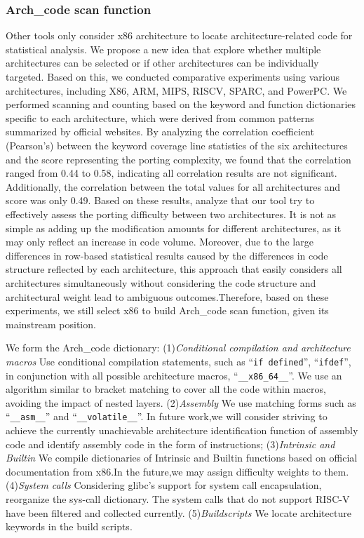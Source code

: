 \documentclass[sigconf,screen,review,anonymous]{acmart}
\begin{document}
\subsubsection{Arch\_code scan function}
Other tools only consider x86 architecture to locate architecture-related code for statistical analysis. We propose a new idea that explore whether multiple architectures can be selected or if other architectures can be individually targeted. Based on this, we conducted comparative experiments using various architectures, including X86, ARM, MIPS, RISCV, SPARC, and PowerPC. We performed scanning and counting based on the keyword and function dictionaries specific to each architecture, which were derived from common patterns summarized by official websites.
By analyzing the correlation coefficient (Pearson's) between the keyword coverage line statistics of the six architectures and the score representing the porting complexity, we found that the correlation ranged from 0.44 to 0.58, indicating all correlation results are not significant. Additionally, the correlation between the total values for all architectures and score was only 0.49.
Based on these results, analyze that our tool try to effectively assess the porting difficulty between two architectures. It is not as simple as adding up the modification amounts for different architectures, as it may only reflect an increase in code volume. Moreover, due to the large differences in row-based statistical results caused by the differences in code structure reflected by each architecture, this approach that easily considers all architectures simultaneously without considering the code structure and architectural weight lead to ambiguous outcomes.Therefore, based on these experiments, we still select x86 to build Arch\_code scan function, given its mainstream position.

We form the Arch\_code dictionary:
(1)\textit{Conditional compilation and architecture macros} Use conditional compilation statements, such as ``\texttt{if defined}'', ``\texttt{ifdef}'', in conjunction with all possible architecture macros,
  ``\texttt{\_\_x86\_64\_\_}''.
  We use an algorithm similar to bracket matching to cover all the code within macros, avoiding the impact of nested layers.
  (2)\textit{Assembly} We use matching forms such as ``\texttt{\_\_asm\_\_}'' and ``\texttt{\_\_volatile\_\_}''.
  In future work,we will consider striving to achieve the currently unachievable architecture identification function of assembly code and identify assembly code in the form of instructions;
  (3)\textit{Intrinsic and Builtin} 
  We compile dictionaries of Intrinsic and Builtin functions based on official documentation from x86\cite{x86intrin}.In the future,we may assign difficulty weights to them.
  (4)\textit{System calls} Considering glibc's support for system call encapsulation, reorganize the sys-call dictionary.
  The system calls that do not support RISC-V have been filtered and collected currently.
  (5)\textit{Buildscripts} We locate architecture keywords in the build scripts.
 
\end{document}
